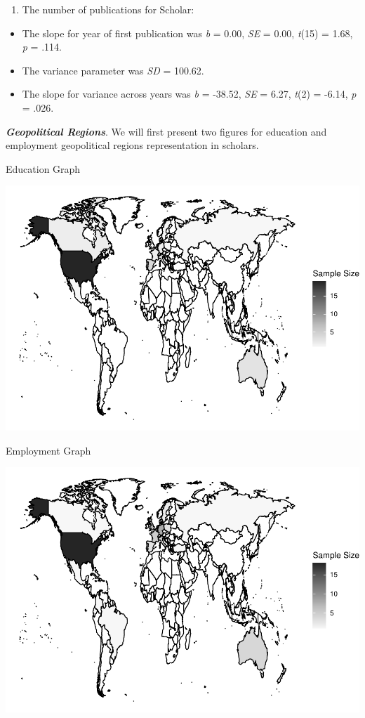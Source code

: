 \documentclass[
  man]{apa6}
\providecommand{\tightlist}{%
  \setlength{\itemsep}{0pt}\setlength{\parskip}{0pt}}
\begin{document}
\begin{enumerate}
\def\labelenumi{\arabic{enumi})}
\setcounter{enumi}{1}
\tightlist
\item
  The number of publications for Scholar:
\end{enumerate}

\begin{itemize}
\tightlist
\item
  The slope for year of first publication was \emph{b} = 0.00, \emph{SE} = 0.00, \emph{t}(15) = 1.68, \emph{p} = .114.
\item
  The variance parameter was \emph{SD} = 100.62.
\item
  The slope for variance across years was \emph{b} = -38.52, \emph{SE} = 6.27, \emph{t}(2) = -6.14, \emph{p} = .026.
\end{itemize}

\textbf{\emph{Geopolitical Regions}}. We will first present two figures for education and employment geopolitical regions representation in scholars.

Education Graph

\includegraphics{04.manuscript_files/figure-latex/figure5-1.pdf}

Employment Graph

\includegraphics{04.manuscript_files/figure-latex/figure6-1.pdf}
\end{document}
